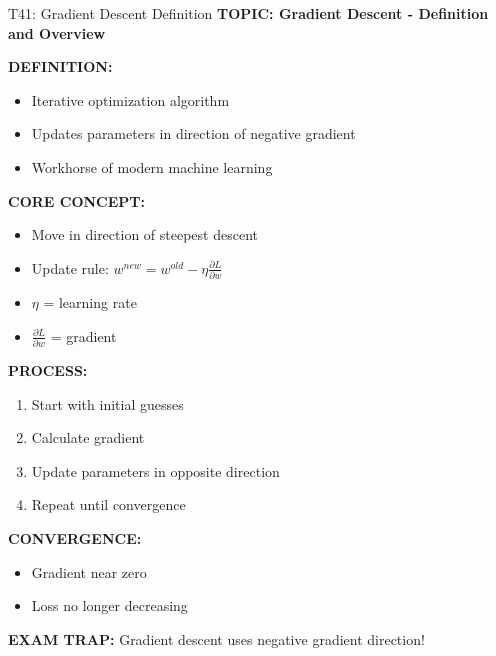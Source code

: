 \documentclass[8pt]{beamer}
\begin{document}
	\begin{frame}{T41: Gradient Descent Definition}
		\fontsize{6.5}{7.5}\selectfont
		\textbf{TOPIC: Gradient Descent - Definition and Overview}
		
		\vspace{0.1cm}
		\textbf{DEFINITION:}
		\begin{itemize}
			\item Iterative optimization algorithm
			\item Updates parameters in direction of negative gradient
			\item Workhorse of modern machine learning
		\end{itemize}
		
		\vspace{0.1cm}
		\textbf{CORE CONCEPT:}
		\begin{itemize}
			\item Move in direction of steepest descent
			\item Update rule: $w^{new} = w^{old} - \eta \frac{\partial L}{\partial w}$
			\item $\eta$ = learning rate
			\item $\frac{\partial L}{\partial w}$ = gradient
		\end{itemize}
		
		\vspace{0.1cm}
		\textbf{PROCESS:}
		\begin{enumerate}
			\item Start with initial guesses
			\item Calculate gradient
			\item Update parameters in opposite direction
			\item Repeat until convergence
		\end{enumerate}
		
		\vspace{0.1cm}
		\textbf{CONVERGENCE:}
		\begin{itemize}
			\item Gradient near zero
			\item Loss no longer decreasing
		\end{itemize}
		
		\textcolor{myred}{\textbf{EXAM TRAP:}} Gradient descent uses \textcolor{myblue}{negative gradient} direction!
	\end{frame}
	
\end{document}
